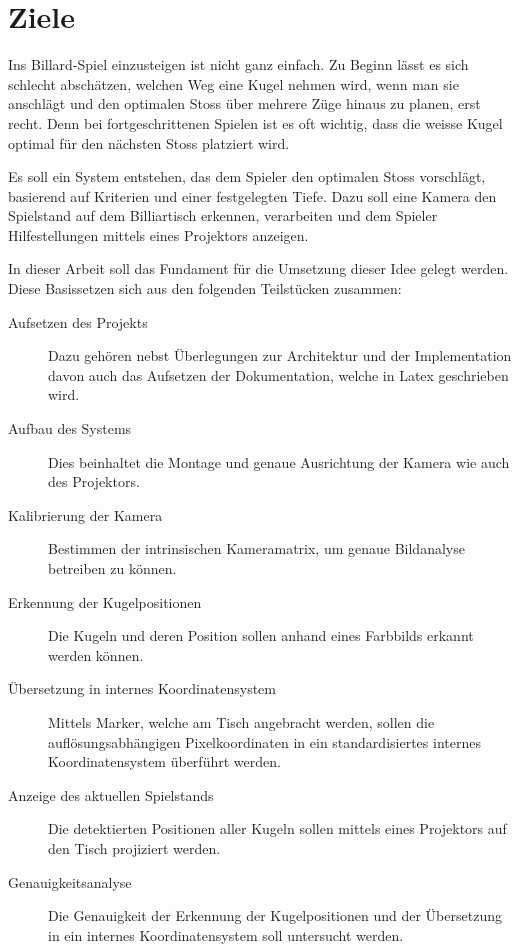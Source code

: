 \chapter{Ziele}
Ins Billard-Spiel einzusteigen ist nicht ganz einfach. Zu Beginn lässt es sich schlecht abschätzen,
welchen Weg eine Kugel nehmen wird, wenn man sie anschlägt und den optimalen Stoss über mehrere Züge hinaus zu planen,
erst recht. Denn bei fortgeschrittenen Spielen ist es oft wichtig, dass die weisse Kugel optimal für den nächsten Stoss
platziert wird.

Es soll ein System entstehen, das dem Spieler den optimalen Stoss vorschlägt, basierend auf Kriterien und
einer festgelegten Tiefe. Dazu soll eine Kamera den Spielstand auf dem Billiartisch erkennen, verarbeiten und
dem Spieler Hilfestellungen mittels eines Projektors anzeigen.

In dieser Arbeit soll das Fundament für die Umsetzung dieser Idee gelegt werden. Diese Basissetzen sich aus den folgenden
Teilstücken zusammen:
\begin{description}
    \item[Aufsetzen des Projekts] Dazu gehören nebst Überlegungen zur Architektur und der Implementation davon auch
    das Aufsetzen der Dokumentation, welche in Latex geschrieben wird.
    \item[Aufbau des Systems] Dies beinhaltet die Montage und genaue Ausrichtung der Kamera wie auch des Projektors.
    \item[Kalibrierung der Kamera] Bestimmen der intrinsischen Kameramatrix, um genaue Bildanalyse betreiben zu können.
    \item[Erkennung der Kugelpositionen] Die Kugeln und deren Position sollen anhand eines Farbbilds erkannt werden können.
    \item[Übersetzung in internes Koordinatensystem] Mittels Marker, welche am Tisch angebracht werden, sollen die
    auflösungsabhängigen Pixelkoordinaten in ein standardisiertes internes Koordinatensystem überführt werden.
    \item[Anzeige des aktuellen Spielstands] Die detektierten Positionen aller Kugeln sollen mittels eines Projektors
    auf den Tisch projiziert werden.
    \item[Genauigkeitsanalyse] Die Genauigkeit der Erkennung der Kugelpositionen und der Übersetzung in ein
    internes Koordinatensystem soll untersucht werden.
\end{description}

